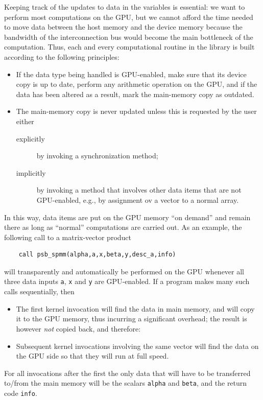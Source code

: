 Keeping track of the updates to data in the variables  is essential: we want
to perform most  computations on the GPU, but we cannot afford the time
needed to move data between the host  memory and the device memory
because the bandwidth of the interconnection bus would become the main
bottleneck of the computation. Thus, each and every computational
routine in the library is built according to the following principles: 
\begin{itemize}
\item If the data type being handled is {GPU}-enabled, make sure that
  its device copy is up to date, perform any arithmetic operation on
  the {GPU}, and if the data has been altered as a result, mark
  the main-memory copy as outdated.
\item The main-memory copy is never updated unless this is requested
  by the user either 
\begin{description}
\item[explicitly] by invoking a synchronization method;
\item[implicitly] by invoking a method that involves other data items
  that are not {GPU}-enabled, e.g., by assignment ov a vector to a
  normal array. 
\end{description}
\end{itemize}
In this way, data items are put on the {GPU} memory ``on demand'' and
remain there as long as ``normal'' computations are carried out. 
As an example, the following call to a matrix-vector product
\lstset{language=Fortran}
\begin{lstlisting}
    call psb_spmm(alpha,a,x,beta,y,desc_a,info)
\end{lstlisting}
will transparently and automatically be performed on the {GPU} whenever
all three data inputs \verb|a|, \verb|x|  and
\verb|y| are {GPU}-enabled. If a program makes many such calls
sequentially, then 
\begin{itemize}
\item The first kernel invocation will find the data in main memory,
  and will copy it to the {GPU} memory, thus incurring a significant
  overhead; the result is however \emph{not} copied back, and
  therefore:
\item Subsequent kernel invocations involving the same vector will
  find the data on the {GPU} side so that they will run at full
  speed.
\end{itemize}
For all invocations after the first the only data that will have to be
transferred to/from the main memory will be the scalars \verb|alpha|
and \verb|beta|, and the return code \verb|info|.  

